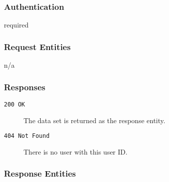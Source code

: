 \documentclass[a4paper,9pt]{extarticle}
\begin{document}
		\subsubsection*{Authentication}
		required
		\subsubsection*{Request Entities}
		n/a
		\subsubsection*{Responses}
		
		\begin{description}
		
			\item[\texttt{200 OK}] The data set is returned as the response entity.
			\item[\texttt{404 Not Found}] There is no user with this user ID.
		\end{description}
	
		\subsubsection*{Response Entities}
		
\end{document}
